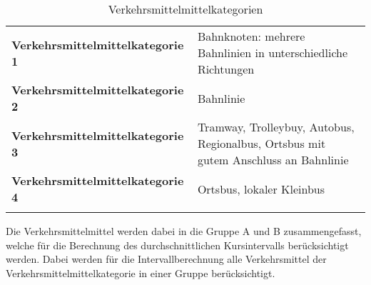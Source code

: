 \begin{longtable}{l p{10.6cm}}
        \midrule
        \textbf{Verkehrsmittelmittelkategorie 1}
                                & Bahnknoten: mehrere Bahnlinien in unterschiedliche Richtungen\\
        \textbf{Verkehrsmittelmittelkategorie 2}
                                & Bahnlinie\\
        \textbf{Verkehrsmittelmittelkategorie 3}
                                & Tramway, Trolleybuy, Autobus, Regionalbus, Ortsbus mit gutem Anschluss an Bahnlinie\\
        \textbf{Verkehrsmittelmittelkategorie 4}
                                & Ortsbus, lokaler Kleinbus\\
        \bottomrule
    \caption{Verkehrsmittelmittelkategorien}
    \label{table:Verkehrsmittelmittelkategorien}
\end{longtable}

Die Verkehrsmittelmittel werden dabei in die Gruppe A und B zusammengefasst, welche für die Berechnung des durchschnittlichen Kursintervalls berücksichtigt werden.
Dabei werden für die Intervallberechnung alle Verkehrsmittel der Verkehrsmittelmittelkategorie in einer Gruppe berücksichtigt.

